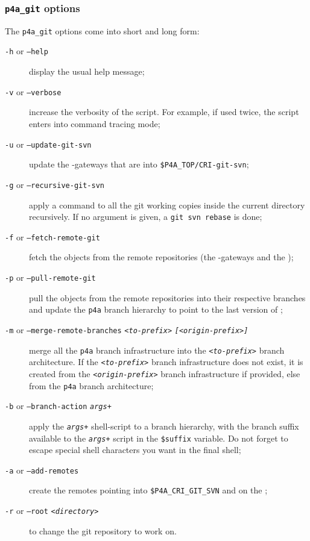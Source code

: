 \documentclass[a4paper]{article}
\begin{document}
\subsubsection{\protect\texttt{p4a\_git} options}
\label{sec:p4a_git-options}

The \verb|p4a_git| options come into short and long form:
\begin{description}
\item[\texttt{-h} or \texttt{--help}] display the usual help message;
\item[\texttt{-v} or \texttt{--verbose}] increase the verbosity of the
  script. For example, if used twice, the script enters into command
  tracing mode;
\item[\texttt{-u} or \texttt{--update-git-svn}] update the \Apips{}
  \Agit-\Asvn gateways that are into \verb|$P4A_TOP/CRI-git-svn|;%
\item[\texttt{-g} or \texttt{--recursive-git-svn}] apply a \Agit command
  to all the git working copies inside the current directory
  recursively. If no argument is given, a \texttt{git svn rebase} is done;
\item[\texttt{-f} or \texttt{--fetch-remote-git}] fetch the objects from
  the remote \Agit repositories (the \Apips{} \Agit-\Asvn gateways and the
  \Apolylib{} \Agit);
\item[\texttt{-p} or \texttt{--pull-remote-git}] pull the objects from the
  remote \Agit repositories into their respective branches and update the
  \texttt{p4a} branch hierarchy to point to the last version of \Apfa;
\item[\texttt{-m} or \texttt{--merge-remote-branches}
  \texttt{\emph{<to-prefix>}} \texttt{\emph{[<origin-prefix>]}}] merge all
  the \texttt{p4a} branch infrastructure into the
  \texttt{\emph{<to-prefix>}} branch architecture. If the
  \texttt{\emph{<to-prefix>}} branch infrastructure does not exist, it is
  created from the \texttt{\emph{<origin-prefix>}} branch infrastructure
  if provided, else from the \texttt{p4a} branch architecture;
\item[\texttt{-b} or \texttt{--branch-action} \texttt{\emph{args+}}] apply
  the \texttt{\emph{args+}} shell-script to a branch hierarchy, with the
  branch suffix available to the \texttt{\emph{args+}} script in the
  \verb|$suffix| variable. Do not forget to escape special shell
  characters you want in the final shell;
\item[\texttt{-a} or \texttt{--add-remotes}] create the remotes pointing
  into \verb|$P4A_CRI_GIT_SVN| and on the \Apolylib{} \Agit;
\item[\texttt{-r} or \texttt{--root} \texttt{<\emph{directory}>}] to
  change the git repository to work on.
\end{description}
\end{document}
